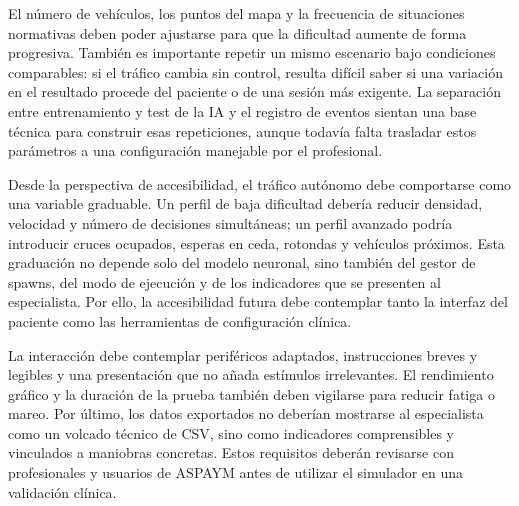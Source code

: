El número de vehículos, los puntos del mapa y la frecuencia de situaciones normativas deben poder ajustarse para que la dificultad aumente de forma progresiva. También es importante repetir un mismo escenario bajo condiciones comparables: si el tráfico cambia sin control, resulta difícil saber si una variación en el resultado procede del paciente o de una sesión más exigente. La separación entre entrenamiento y test de la IA y el registro de eventos sientan una base técnica para construir esas repeticiones, aunque todavía falta trasladar estos parámetros a una configuración manejable por el profesional.

Desde la perspectiva de accesibilidad, el tráfico autónomo debe comportarse como una variable graduable. Un perfil de baja dificultad debería reducir densidad, velocidad y número de decisiones simultáneas; un perfil avanzado podría introducir cruces ocupados, esperas en ceda, rotondas y vehículos próximos. Esta graduación no depende solo del modelo neuronal, sino también del gestor de spawns, del modo de ejecución y de los indicadores que se presenten al especialista. Por ello, la accesibilidad futura debe contemplar tanto la interfaz del paciente como las herramientas de configuración clínica.

La interacción debe contemplar periféricos adaptados, instrucciones breves y legibles y una presentación que no añada estímulos irrelevantes. El rendimiento gráfico y la duración de la prueba también deben vigilarse para reducir fatiga o mareo. Por último, los datos exportados no deberían mostrarse al especialista como un volcado técnico de CSV, sino como indicadores comprensibles y vinculados a maniobras concretas. Estos requisitos deberán revisarse con profesionales y usuarios de ASPAYM antes de utilizar el simulador en una validación clínica.
